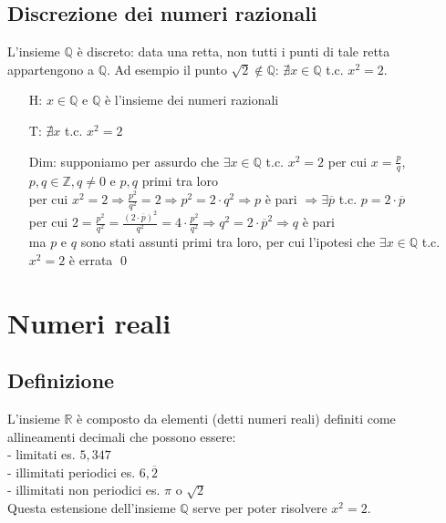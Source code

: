 \documentclass[a4paper]{article}
\begin{document}
\subsection{Discrezione dei numeri razionali}
L'insieme \(\mathbb{Q}\) è discreto: data una retta, non tutti i punti di tale retta appartengono a \(\mathbb{Q}\).
Ad esempio il punto \(\sqrt{2} \notin \mathbb{Q}\): \(\nexists x \in \mathbb{Q}\) t.c. \(x^2 = 2\).
\begin{itemize}
	\item[H:] \(x \in \mathbb{Q}\) e \(\mathbb{Q}\) è l'insieme dei numeri razionali
	\item[T:] \(\nexists x\) t.c. \(x^2 = 2\)
	\item[Dim:] supponiamo per assurdo che \(\exists x \in \mathbb{Q}\) t.c. \(x^2 = 2\) per cui \(x = \displaystyle \frac{p}{q}\), \(p,q \in \mathbb{Z}, q \neq 0\) e \(p,q\) primi tra loro \\
	per cui \(x^2 = 2 \Rightarrow \displaystyle \frac{p^2}{q^2} = 2 \Rightarrow p^2 = 2 \cdot q^2 \Rightarrow p\) è pari \(\Rightarrow \exists \overline{p}\) t.c. \(p = 2 \cdot \overline{p}\) \\
	per cui \(2 = \displaystyle \frac{p^2}{q^2} = \frac{(2 \cdot \overline{p})^2}{q^2} = 4 \cdot \frac{p^2}{q^2} \Rightarrow q^2 = 2 \cdot \overline{p}^2 \Rightarrow q\) è pari \\
	ma \(p\) e \(q\) sono stati assunti primi tra loro, per cui l'ipotesi che \(\exists x \in \mathbb{Q}\) t.c. \(x^2 = 2\) è errata \qed
\end{itemize}

\newpage

\section{Numeri reali}
\subsection{Definizione}
L'insieme \(\mathbb{R}\) è composto da elementi (detti numeri reali) definiti come allineamenti decimali che possono essere: \\
- limitati es. \(5,347\) \\
- illimitati periodici es. \(6,\overline{2}\) \\
- illimitati non periodici es. \(\pi\) o \(\sqrt{2}\) \\
Questa estensione dell'insieme \(\mathbb{Q}\) serve per poter risolvere \(x^2 = 2\).
\end{document}
